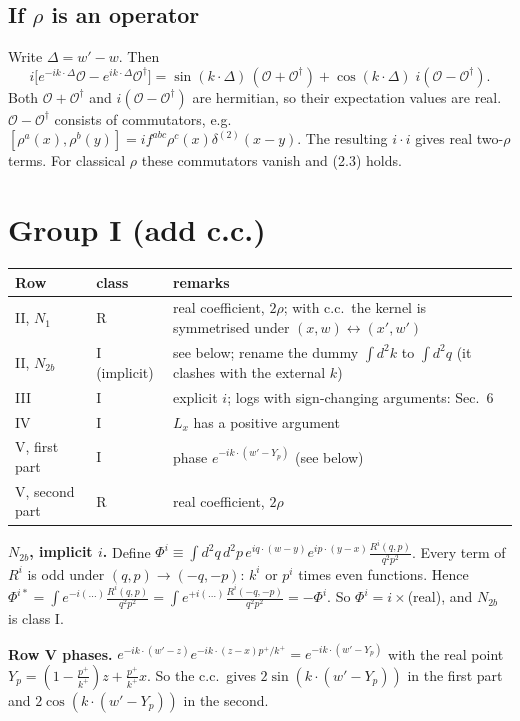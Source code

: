\documentclass[10pt]{article}
\numberwithin{equation}{section}
\newcommand{\red}[1]{{\color{red}#1}}
\begin{document}
\subsection{If $\rho$ is an operator}
Write $\Delta=w'-w$. Then
\begin{equation}
i\big[e^{-ik\cdot\Delta}\mathcal O-e^{ik\cdot\Delta}\mathcal O^\dagger\big]=\sin(k\cdot\Delta)\,(\mathcal O+\mathcal O^\dagger)+\cos(k\cdot\Delta)\;i(\mathcal O-\mathcal O^\dagger).
\end{equation}
Both $\mathcal O+\mathcal O^\dagger$ and $i(\mathcal O-\mathcal O^\dagger)$ are hermitian, so their expectation values are real. $\mathcal O-\mathcal O^\dagger$ consists of commutators, e.g.\
$[\rho^a(x),\rho^b(y)]=if^{abc}\rho^c(x)\delta^{(2)}(x-y)$. The resulting $i\cdot i$ gives real two-$\rho$ terms. For classical $\rho$ these commutators vanish and (2.3) holds.

\section{Group I (add c.c.)}
\begin{tabular}{p{}p{}p{}}
\toprule
Row & class & remarks\\\midrule
II, $N_1$ & R & real coefficient, $2\rho$; with c.c.\ the kernel is symmetrised under $(x,w)\leftrightarrow(x',w')$\\
II, $N_{2b}$ & I (implicit) & see below; \red{rename the dummy $\int d^2k$ to $\int d^2q$} (it clashes with the external $k$)\\
III & I & explicit $i$; \red{logs with sign-changing arguments: Sec.~6}\\
IV & I & $L_x$ has a positive argument\\
V, first part & I & phase $e^{-ik\cdot(w'-Y_p)}$ (see below)\\
V, second part & R & real coefficient, $2\rho$\\\bottomrule
\end{tabular}

\textbf{$N_{2b}$, implicit $i$.} Define $\Phi^i\equiv\int d^2q\,d^2p\,e^{iq\cdot(w-y)}e^{ip\cdot(y-x)}\frac{R^i(q,p)}{q^2p^2}$. Every term of $R^i$ is odd under $(q,p)\to(-q,-p)$: $k^i$ or $p^i$ times even functions. Hence $\Phi^{i*}=\int e^{-i(\dots)}\frac{R^i(q,p)}{q^2p^2}=\int e^{+i(\dots)}\frac{R^i(-q,-p)}{q^2p^2}=-\Phi^i$. So $\Phi^i=i\times$(real), and $N_{2b}$ is class I.

\textbf{Row V phases.} $e^{-ik\cdot(w'-z)}e^{-ik\cdot(z-x)p^+/k^+}=e^{-ik\cdot(w'-Y_p)}$ with the real point $Y_p=(1-\frac{p^+}{k^+})z+\frac{p^+}{k^+}x$. So the c.c.\ gives $2\sin(k\cdot(w'-Y_p))$ in the first part and $2\cos(k\cdot(w'-Y_p))$ in the second.
\end{document}
